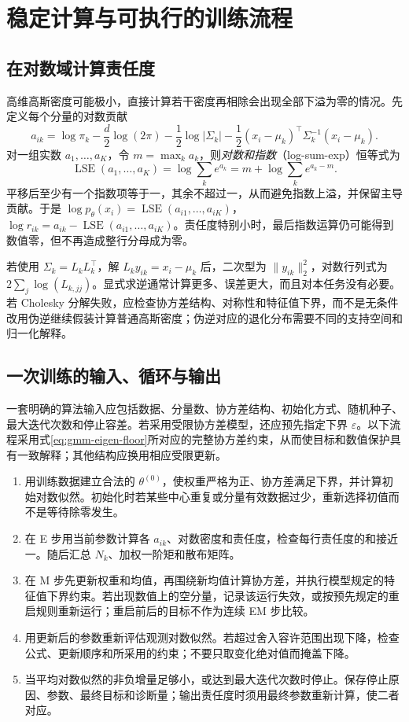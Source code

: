 \documentclass[UTF8,12pt,a4paper,fontset=fandol]{ctexart}
\begin{document}
\section{稳定计算与可执行的训练流程}
\label{sec:gmm-implementation}

\subsection{在对数域计算责任度}
高维高斯密度可能极小，直接计算若干密度再相除会出现全部下溢为零的情况。先定义每个分量的对数贡献
\[
a_{ik}=\log\pi_k-\frac d2\log(2\pi)-\frac12\log|\Sigma_k|
-\frac12(x_i-\mu_k)^\top\Sigma_k^{-1}(x_i-\mu_k).
\]
对一组实数 $a_1,\ldots,a_K$，令 $m=\max_ka_k$，则\emph{对数和指数}（log-sum-exp）恒等式为
\begin{equation}
\operatorname{LSE}(a_1,\ldots,a_K)
=\log\sum_ke^{a_k}=m+\log\sum_ke^{a_k-m}.
\label{eq:gmm-lse}
\end{equation}
平移后至少有一个指数项等于一，其余不超过一，从而避免指数上溢，并保留主导贡献。于是 $\log p_\theta(x_i)=\operatorname{LSE}(a_{i1},\ldots,a_{iK})$，$\log r_{ik}=a_{ik}-\operatorname{LSE}(a_{i1},\ldots,a_{iK})$。责任度特别小时，最后指数运算仍可能得到数值零，但不再造成整行分母成为零。

若使用 $\Sigma_k=L_kL_k^\top$，解 $L_ky_{ik}=x_i-\mu_k$ 后，二次型为 $\|y_{ik}\|_2^2$，对数行列式为 $2\sum_j\log(L_{k,jj})$。显式求逆通常计算更多、误差更大，而且对本任务没有必要。若 Cholesky 分解失败，应检查协方差结构、对称性和特征值下界，而不是无条件改用伪逆继续假装计算普通高斯密度；伪逆对应的退化分布需要不同的支持空间和归一化解释。

\subsection{一次训练的输入、循环与输出}
一套明确的算法输入应包括数据、分量数、协方差结构、初始化方式、随机种子、最大迭代次数和停止容差。若采用受限协方差模型，还应预先指定下界 $\varepsilon$。以下流程采用式\eqref{eq:gmm-eigen-floor}所对应的完整协方差约束，从而使目标和数值保护具有一致解释；其他结构应换用相应受限更新。
\begin{enumerate}
\item 用训练数据建立合法的 $\theta^{(0)}$，使权重严格为正、协方差满足下界，并计算初始对数似然。初始化时若某些中心重复或分量有效数据过少，重新选择初值而不是等待除零发生。
\item 在 E 步用当前参数计算各 $a_{ik}$、对数密度和责任度，检查每行责任度的和接近一。随后汇总 $N_k$、加权一阶矩和散布矩阵。
\item 在 M 步先更新权重和均值，再围绕新均值计算协方差，并执行模型规定的特征值下界约束。若出现数值上的空分量，记录该运行失效，或按预先规定的重启规则重新运行；重启前后的目标不作为连续 EM 步比较。
\item 用更新后的参数重新评估观测对数似然。若超过舍入容许范围出现下降，检查公式、更新顺序和所采用的约束；不要只取变化绝对值而掩盖下降。
\item 当平均对数似然的非负增量足够小，或达到最大迭代次数时停止。保存停止原因、参数、最终目标和诊断量；输出责任度时须用最终参数重新计算，使二者对应。
\end{enumerate}
\end{document}
